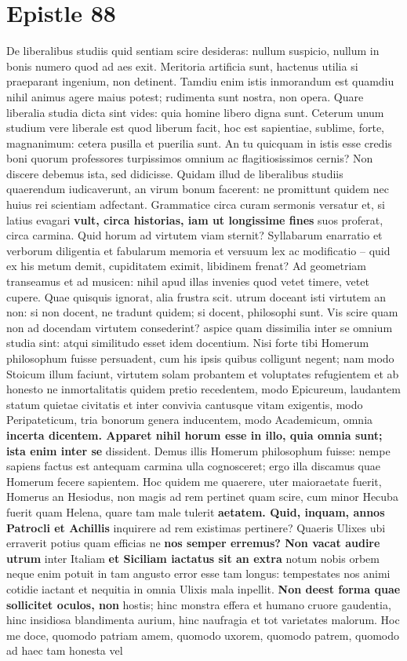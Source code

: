 \section{Epistle 88}
De liberalibus studiis quid sentiam scire desideras: nullum suspicio, nullum in bonis numero quod ad aes exit. Meritoria artificia sunt, hactenus utilia si praeparant ingenium, non detinent. Tamdiu enim istis inmorandum est quamdiu nihil animus agere maius potest; rudimenta sunt nostra, non opera. Quare liberalia studia dicta sint vides: quia homine libero digna sunt. Ceterum unum studium vere liberale est quod liberum facit, hoc est sapientiae, sublime, forte, magnanimum: cetera pusilla et puerilia sunt. An tu quicquam in istis esse credis boni quorum professores turpissimos omnium ac flagitiosissimos cernis? Non discere debemus ista, sed didicisse. Quidam illud de liberalibus studiis quaerendum iudicaverunt, an virum bonum facerent: ne promittunt quidem nec huius rei scientiam adfectant. Grammatice circa curam sermonis versatur et, si latius evagari \textbf{vult, circa historias, iam ut longissime fines} suos proferat, circa carmina. Quid horum ad virtutem viam sternit? Syllabarum enarratio et verborum diligentia et fabularum memoria et versuum lex ac modificatio -- quid ex his metum demit, cupiditatem eximit, libidinem frenat? Ad geometriam transeamus et ad musicen: nihil apud illas invenies quod vetet timere, vetet cupere. Quae quisquis ignorat, alia frustra scit. utrum doceant isti virtutem an non: si non docent, ne tradunt quidem; si docent, philosophi sunt. Vis scire quam non ad docendam virtutem consederint? aspice quam dissimilia inter se omnium studia sint: atqui similitudo esset idem docentium. Nisi forte tibi Homerum philosophum fuisse persuadent, cum his ipsis quibus colligunt negent; nam modo Stoicum illum faciunt, virtutem solam probantem et voluptates refugientem et ab honesto ne inmortalitatis quidem pretio recedentem, modo Epicureum, laudantem statum quietae civitatis et inter convivia cantusque vitam exigentis, modo Peripateticum, tria bonorum genera inducentem, modo Academicum, omnia \textbf{incerta \textbf{dicentem. Apparet nihil \textbf{horum} esse \textbf{\textbf{in illo,} quia omnia sunt; ista} enim inter} se} dissident. Demus illis Homerum philosophum fuisse: nempe sapiens factus est antequam carmina ulla cognosceret; ergo illa discamus quae Homerum fecere sapientem. Hoc quidem me quaerere, uter maioraetate fuerit, Homerus an Hesiodus, non magis ad rem pertinet quam scire, cum minor Hecuba fuerit quam Helena, quare tam male tulerit \textbf{aetatem. Quid, inquam, annos Patrocli et Achillis} inquirere ad rem existimas pertinere? Quaeris Ulixes ubi erraverit potius quam efficias ne \textbf{nos semper erremus? Non vacat audire utrum} inter Italiam \textbf{et Siciliam iactatus sit an extra} notum nobis orbem neque enim potuit in tam angusto error esse tam longus: tempestates nos animi cotidie iactant et nequitia in omnia Ulixis mala inpellit. \textbf{Non deest forma quae sollicitet oculos, non} hostis; hinc monstra effera et humano cruore gaudentia, hinc insidiosa blandimenta aurium, hinc naufragia et tot varietates malorum. Hoc me doce, quomodo patriam amem, quomodo uxorem, quomodo patrem, quomodo ad haec tam honesta vel 